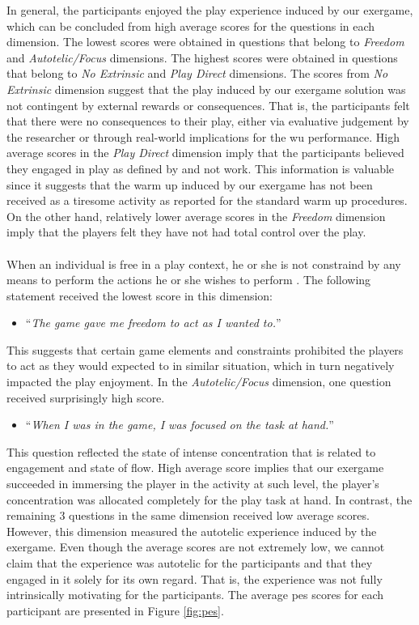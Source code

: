 In general, the participants enjoyed the play experience induced by our exergame, which can be concluded from high average scores for the questions in each dimension. The lowest scores were obtained in questions that belong to \textit{Freedom} and \textit{Autotelic/Focus} dimensions. The highest scores were obtained in questions that belong to \textit{No Extrinsic} and \textit{Play Direct} dimensions. The scores from \textit{No Extrinsic} dimension suggest that the play induced by our exergame solution was not contingent by external rewards or consequences. That is, the participants felt that there were no consequences to their play, either via evaluative judgement by the researcher or through real-world implications for the \acrshort{wu} performance. High average scores in the \textit{Play Direct} dimension imply that the participants believed they engaged in play as defined by \cite{pavlas2012play} and not work. This information is valuable since it suggests that the warm up induced by our exergame has not been received as a tiresome activity as reported for the standard warm up procedures. On the other hand, relatively lower average scores in the \textit{Freedom} dimension imply that the players felt they have not had total control over the play. \\\\When an individual is free in a play context, he or she is not constraind by any means to perform the actions he or she wishes to perform \cite{pavlas2012play}. The following statement received the lowest score in this dimension: 
\begin{itemize}
\item ``\textit{The game gave me freedom to act as I wanted to.}''
\end{itemize} This suggests that certain game elements and constraints prohibited the players to act as they would expected to in similar situation, which in turn negatively impacted the play enjoyment.  In the \textit{Autotelic/Focus} dimension, one question received surprisingly high score.  
\begin{itemize}
\item ``\textit{When I was in the game, I was focused on the task at hand.}''
\end{itemize} This question reflected the state of intense concentration that is related to engagement and state of flow. High average score implies that our exergame succeeded in immersing the player in the activity at such  level, the player's concentration was allocated completely for the play task at hand.  In contrast, the remaining 3 questions in the same dimension received low average scores. However, this dimension measured the autotelic experience induced by the exergame.  Even though the average scores are not extremely low, we cannot claim that the experience was autotelic for the participants and that they engaged in it solely for its own regard. That is, the experience was not fully intrinsically motivating for the participants. The average \gls{pes} scores for each participant are presented in Figure \ref{fig:pes}.
